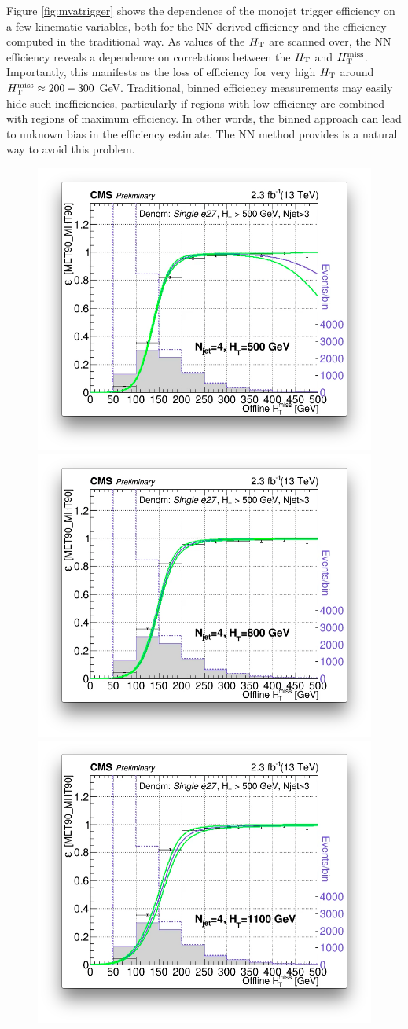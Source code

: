 Figure \ref{fig:mvatrigger} shows the dependence of the monojet trigger efficiency on a few kinematic variables, both for the NN-derived efficiency and the efficiency computed in the traditional way. As values of the $H_{\rm T}$ are scanned over, the NN efficiency reveals a dependence on correlations between the $H_{\rm T}$ and $H_{\text{T}}^{\rm miss}$. Importantly, this manifests as the loss of efficiency for very high $H_{\rm T}$ around $H_{\text{T}}^{\rm miss}\approx200-300$ GeV. Traditional, binned efficiency measurements may easily hide such inefficiencies, particularly if regions with low efficiency are combined with  regions of maximum efficiency. In other words, the binned approach can lead to unknown bias in the efficiency estimate. The NN method provides is a natural way to avoid this problem. 
\begin{figure}[tb!]
  \begin{center}
    \includegraphics[width=0.49\linewidth]{figures/trigger/MonoTrigEff_Ht500.png}
    \includegraphics[width=0.49\linewidth]{figures/trigger/MonoTrigEff_Ht800.png}\\
        \includegraphics[width=0.49\linewidth]{figures/trigger/MonoTrigEff_Ht1100.png}

\end{center}
\end{figure}
